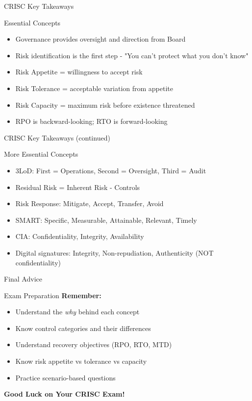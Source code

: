 \documentclass{beamer}
\begin{document}
	\begin{frame}{CRISC Key Takeaways}
		\begin{block}{Essential Concepts}
			\begin{itemize}
				\item Governance provides oversight and direction from Board
				\item Risk identification is the first step - "You can't protect what you don't know"
				\item Risk Appetite = willingness to accept risk
				\item Risk Tolerance = acceptable variation from appetite
				\item Risk Capacity = maximum risk before existence threatened
				\item RPO is backward-looking; RTO is forward-looking
			\end{itemize}
		\end{block}
	\end{frame}
	
	\begin{frame}{CRISC Key Takeaways (continued)}
		\begin{block}{More Essential Concepts}
			\begin{itemize}
				\item 3LoD: First = Operations, Second = Oversight, Third = Audit
				\item Residual Risk = Inherent Risk - Controls
				\item Risk Response: Mitigate, Accept, Transfer, Avoid
				\item SMART: Specific, Measurable, Attainable, Relevant, Timely
				\item CIA: Confidentiality, Integrity, Availability
				\item Digital signatures: Integrity, Non-repudiation, Authenticity (NOT confidentiality)
			\end{itemize}
		\end{block}
	\end{frame}
	
	\begin{frame}[shrink=10]{Final Advice}
		\begin{block}{Exam Preparation}
			\centering
			\vspace{0.3cm}
			\textbf{Remember:}
			\begin{itemize}
				\item Understand the \textit{why} behind each concept
				\item Know control categories and their differences
				\item Understand recovery objectives (RPO, RTO, MTD)
				\item Know risk appetite vs tolerance vs capacity
				\item Practice scenario-based questions
			\end{itemize}
			\vspace{0.5cm}
			\textbf{Good Luck on Your CRISC Exam!}
		\end{block}
	\end{frame}
	
\end{document}
